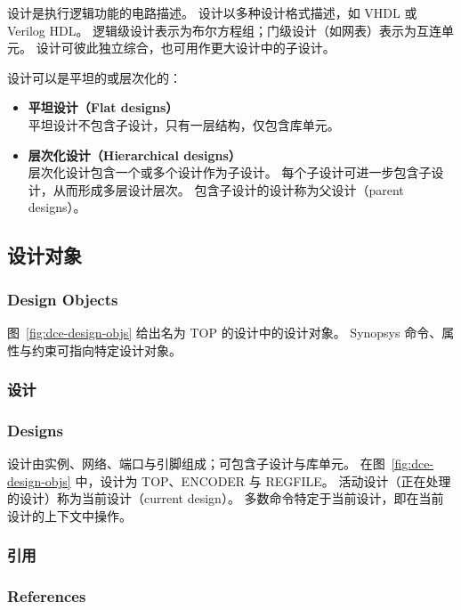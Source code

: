 设计是执行逻辑功能的电路描述。
设计以多种设计格式描述，如 VHDL 或 Verilog HDL。
逻辑级设计表示为布尔方程组；门级设计（如网表）表示为互连单元。
设计可彼此独立综合，也可用作更大设计中的子设计。

设计可以是平坦的或层次化的：
\begin{itemize}
  \item \textbf{平坦设计（Flat designs）}\\
        平坦设计不包含子设计，只有一层结构，仅包含库单元。
  \item \textbf{层次化设计（Hierarchical designs）}\\
        层次化设计包含一个或多个设计作为子设计。
        每个子设计可进一步包含子设计，从而形成多层设计层次。
        包含子设计的设计称为父设计（parent designs）。
\end{itemize}

\subsection{设计对象}
\subsubsection*{Design Objects}

图~\ref{fig:dce-design-objs} 给出名为 TOP 的设计中的设计对象。
Synopsys 命令、属性与约束可指向特定设计对象。


\subsubsection{设计}
\subsubsection*{Designs}

设计由实例、网络、端口与引脚组成；可包含子设计与库单元。
在图~\ref{fig:dce-design-objs} 中，设计为 TOP、ENCODER 与 REGFILE。
活动设计（正在处理的设计）称为当前设计（current design）。
多数命令特定于当前设计，即在当前设计的上下文中操作。

\subsubsection{引用}
\subsubsection*{References}

